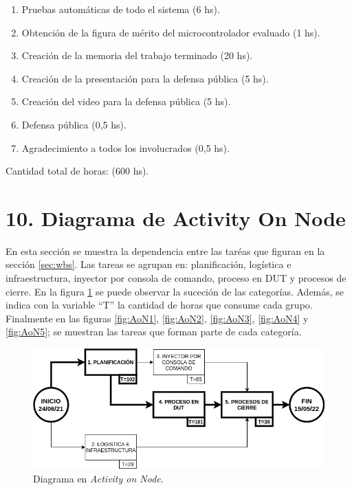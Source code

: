 \documentclass[
11pt, %
]{charter}
\begin{document}
\begin{enumerate}
\begin{enumerate}
		\item Pruebas automáticas de todo el sistema (6 hs).
		\item Obtención de la figura de mérito del microcontrolador evaluado (1 hs).
		\item Creación de la memoria del trabajo terminado (20 hs).
		\item Creación de la presentación para la defensa pública (5 hs).
		\item Creación del video para la defensa pública (5 hs).
		\item Defensa pública (0,5 hs).
		\item Agradecimiento a todos los involucrados (0,5 hs).
	\end{enumerate}
\end{enumerate}

Cantidad total de horas: (600 hs).

\section{10. Diagrama de Activity On Node}
\label{sec:AoN}

En esta sección se muestra la dependencia entre las taréas que figuran en la sección \ref{sec:wbs}.
Las tareas se agrupan en: planificación, logística e infraestructura, inyector por consola de comando, proceso en DUT y procesos de cierre.
En la figura \ref{fig:AoN} se puede observar la suceción de las categorías.
Además, se indica con la variable ``T'' la cantidad de horas que consume cada grupo.
Finalmente en las figuras \ref{fig:AoN1}, \ref{fig:AoN2}, \ref{fig:AoN3}, \ref{fig:AoN4} y \ref{fig:AoN5}; se muestran las tareas que forman parte de cada categoría.

\begin{figure}[htpb]
\centering 
\includegraphics[width=.8\textwidth]{./Figuras/AoN.png}
\caption{Diagrama en \textit{Activity on Node}.}
\label{fig:AoN}
\end{figure}
\end{document}
